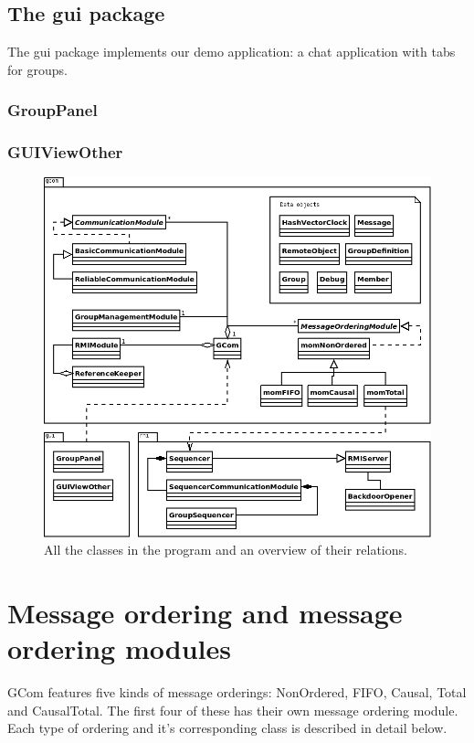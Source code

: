 \documentclass[english]{article}
\begin{document}
\subsection{The gui package}
The gui package implements our demo application: a chat application with tabs for groups. 

\subsubsection{GroupPanel}

\subsubsection{GUIViewOther}


\begin{figure}
\includegraphics[width=\textwidth]{superuml.png}
\caption{All the classes in the program and an overview of their relations.}
\label{fig:overview}
\end{figure}

\section{Message ordering and message ordering modules}
\label{messageordering}
GCom features five kinds of message orderings: NonOrdered, FIFO, Causal, Total and CausalTotal. The first four of these has their own message ordering module. Each type of ordering and it's corresponding class is described in detail below.
\end{document}
